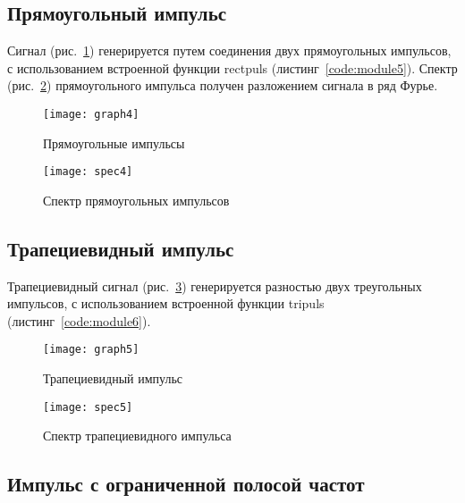 \subsection{Прямоугольный импульс}

Сигнал (рис.~\ref{pic:graph4}) генерируется путем соединения двух прямоугольных импульсов, с использованием встроенной функции rectpuls (листинг~\ref{code:module5}). Спектр (рис.~\ref{pic:spec4}) прямоугольного импульса получен разложением сигнала в ряд Фурье.

\begin{figure}[H]
	\begin{center}
		\texttt{[image: graph4]}
		\caption{Прямоугольные импульсы} 
		\label{pic:graph4} %
	\end{center}
\end{figure}

\begin{figure}[H]
	\begin{center}
		\texttt{[image: spec4]}
		\caption{Спектр прямоугольных импульсов} 
		\label{pic:spec4} %
	\end{center}
\end{figure}

\subsection{Трапециевидный импульс}

Трапециевидный сигнал (рис.~\ref{pic:graph5}) генерируется разностью двух треугольных импульсов,
 с использованием встроенной функции tripuls (листинг~\ref{code:module6}).

\begin{figure}[H]
	\begin{center}
		\texttt{[image: graph5]}
		\caption{Трапециевидный импульс} 
		\label{pic:graph5} %
	\end{center}
\end{figure}

\begin{figure}[H]
	\begin{center}
		\texttt{[image: spec5]}
		\caption{Спектр трапециевидного импульса} 
		\label{pic:spec5} %
	\end{center}
\end{figure}

\subsection{Импульс с ограниченной полосой частот}

